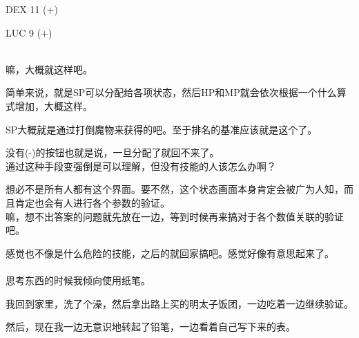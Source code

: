   DEX 11 (+)

  LUC  9 (+)

\cardline\\

嘛，大概就这样吧。

简单来说，就是SP可以分配给各项状态，然后HP和MP就会依次根据一个什么算式增加，大概这样。

SP大概就是通过打倒魔物来获得的吧。至于排名的基准应该就是这个了。

没有(-)的按钮也就是说，一旦分配了就回不来了。\\

通过这种手段变强倒是可以理解，但没有技能的人该怎么办啊？

想必不是所有人都有这个界面。要不然，这个状态画面本身肯定会被广为人知，而且肯定也会有人进行各个参数的验证。\\

嘛，想不出答案的问题就先放在一边，等到时候再来搞对于各个数值关联的验证吧。

感觉也不像是什么危险的技能，之后的就回家搞吧。感觉好像有意思起来了。\\

\sqsplit\\

思考东西的时候我倾向使用纸笔。

我回到家里，洗了个澡，然后拿出路上买的明太子饭团，一边吃着一边继续验证。

然后，现在我一边无意识地转起了铅笔，一边看着自己写下来的表。\\

